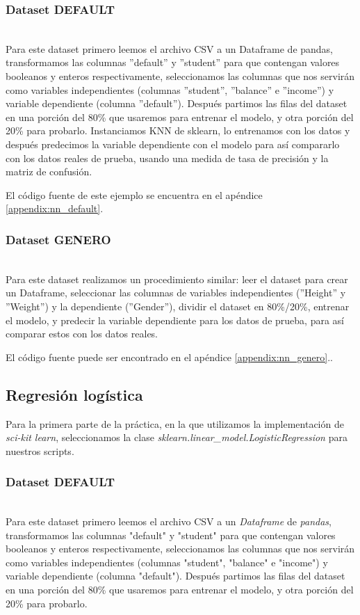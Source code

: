 \documentclass[sigconf,authorversion,nonacm]{acmart}
\begin{document}
\subsubsection{Dataset DEFAULT}\hfill\\
Para este dataset primero leemos el archivo CSV a un Dataframe de pandas, transformamos las columnas ”default” y ”student” para que contengan valores booleanos y enteros respectivamente, seleccionamos las columnas que nos servirán como variables independientes (columnas ”student”, ”balance” e ”income”) y variable dependiente (columna ”default”). Después partimos las filas del dataset en una porción del 80\% que usaremos para entrenar el modelo, y otra porción del 20\% para probarlo.
Instanciamos KNN de sklearn, lo entrenamos con los datos y después predecimos la variable dependiente con el modelo para así compararlo con los datos reales de prueba, usando una medida de tasa de precisión y la matriz de confusión.

El código fuente de este ejemplo se encuentra en el apéndice \ref{appendix:nn_default}.
\subsubsection{Dataset GENERO}\hfill\\
Para este dataset realizamos un procedimiento similar: leer el dataset
para crear un Dataframe, seleccionar las columnas de variables independientes (”Height” y ”Weight”) y la dependiente (”Gender”),
dividir el dataset en 80\%/20\%, entrenar el modelo, y predecir la variable dependiente para los datos de prueba, para así comparar estos
con los datos reales.

El código fuente puede ser encontrado en el apéndice \ref{appendix:nn_genero}..

\subsection{Regresión logística}
Para la primera parte de la práctica, en la que utilizamos la implementación de \textit{sci-kit learn}, seleccionamos la clase \newline\textit{sklearn.linear\_model.LogisticRegression}\cite{scikit-learn} para nuestros scripts.

\subsubsection{Dataset DEFAULT}\hfill\\
Para este dataset primero leemos el archivo CSV a un \textit{Dataframe} de \textit{pandas}, transformamos las columnas "default" y "student" para que contengan valores booleanos y enteros respectivamente, seleccionamos las columnas que nos servirán como variables independientes (columnas "student", "balance" e "income") y variable dependiente (columna "default"). Después partimos las filas del dataset en una porción del 80\% que usaremos para entrenar el modelo, y otra porción del 20\% para probarlo.
\end{document}
